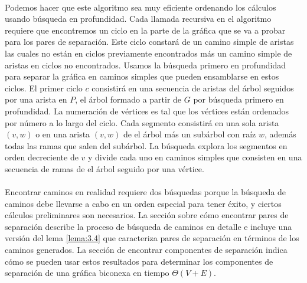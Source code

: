 \paragraph{}
Podemos hacer que este algoritmo sea muy eficiente ordenando los cálculos usando búsqueda en profundidad. Cada llamada recursiva en el algoritmo requiere que encontremos un ciclo en la parte de la gráfica que se va a probar para los pares de separación. Este ciclo constará de un camino simple de aristas las cuales no están en ciclos previamente encontrados más un camino simple de aristas en ciclos no encontrados. Usamos la búsqueda primero en profundidad para separar la gráfica en caminos simples que pueden ensamblarse en estos ciclos. El primer ciclo $c$ consistirá en una secuencia de aristas del árbol seguidos por una arista en $P$, el árbol formado a partir de $G$ por búsqueda primero en profundidad. La numeración de vértices es tal que los vértices están ordenados por número a lo largo del ciclo. Cada segmento consistirá en una sola arista $\left(v, w\right)$ o en una arista $\left(v, w\right)$ de el árbol más un subárbol con raíz $w$, además todas las ramas que salen del subárbol. La búsqueda explora los segmentos en orden decreciente de $v$ y divide cada uno en caminos simples que consisten en una secuencia de ramas de el árbol seguido por una vértice.

\paragraph{}
Encontrar caminos en realidad requiere dos búsquedas porque la búsqueda de caminos debe llevarse a cabo en un orden especial para tener éxito, y ciertos cálculos preliminares son necesarios. La sección sobre cómo encontrar pares de separación describe la proceso de búsqueda de caminos en detalle e incluye una versión del lema \ref{lema:3.4} que caracteriza pares de separación en términos de los caminos generados. La sección de encontrar componentes de separación indica cómo se pueden usar estos resultados para determinar los componentes de separación de una gráfica biconexa en tiempo $\Theta \left(V + E\right)$.

